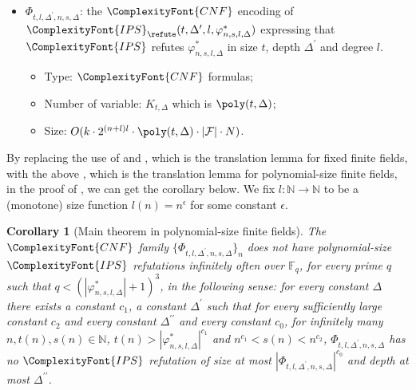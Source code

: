 \documentclass[11pt,letter]{article}
\newtheorem{corollary}[theorem]{Corollary}
\theoremstyle{remark} %
\newcommand{\IPS}{%
    {
        \ComplexityFont{IPS} 
    }
}
\newcommand{\CNF}{ %
    {
        \ComplexityFont{CNF}
    }
}
\begin{document}
{\begin{itemize}
\begin{itemize}
                \item Size: $O(k \cdot 2^{(n+l)l} \cdot \poly(s, \Delta) \cdot N)$.
            \end{itemize}
        \item $\Phi_{t,l,\Delta^\prime,n,s,\Delta}$: the $\CNF$ encoding of $\IPS_\refute(t,\Delta^\prime,l,\varphi_{n,s,l,\Delta}^\ast)$ expressing that $\IPS$ refutes $\varphi_{n,s,l,\Delta}^\ast$ in size $t$, depth $\Delta^\prime$ and degree $l$.
            \begin{itemize}
                \item Type: $\CNF$ formulas;
                \item Number of variable: $K_{t, \Delta}$ which is $\poly(t, \Delta)$;
                \item Size: $O(k \cdot 2^{(n+l)l} \cdot \poly(t, \Delta) \cdot |\mathcal{F}| \cdot N)$.
            \end{itemize}
    \end{itemize}
By replacing the use of  and , which is the translation lemma for fixed finite fields, with the above , which is the translation lemma for polynomial-size finite fields, in the proof of , we can get the corollary below.
We fix $l: \mathbb{N} \to \mathbb{N}$ to be a (monotone) size function $l(n) = n^\epsilon$ for some constant $ \epsilon$.

\begin{corollary}[Main theorem in polynomial-size finite fields]\label{theorem: main theorem in Polynomial-size Finite Fields}
        The $\CNF$ family $\{\Phi_{t,l,\Delta^\prime,n,s,\Delta}\}_n$ does not have polynomial-size $\IPS$ refutations infinitely often over $\mathbb{F}_q$, for every prime $q$ such that $q < (|\varphi_{n,s,l,\Delta}^\ast|+1)^3$, in the following sense: 
        for every constant $\Delta$ there exists a constant $c_1$, a constant $\Delta^\prime$ such that for every sufficiently large constant $c_2$ and every constant $\Delta^{\prime\prime}$ and every constant $c_0$, for infinitely many $n, t(n), s(n) \in \mathbb{N}$, $t(n) > |\varphi_{n,s,l,\Delta}^\ast|^{c_1}$ and $n^{c_1} < s(n) < n^{c_2}$, $\Phi_{t,l,\Delta^\prime,n,s,\Delta}$ has no $\IPS$ refutation of size at most $|\Phi_{t,l,\Delta^\prime,n,s,\Delta}|^{c_0}$ and depth at most $\Delta^{\prime\prime}$.
    \end{corollary}

}
\end{document}

